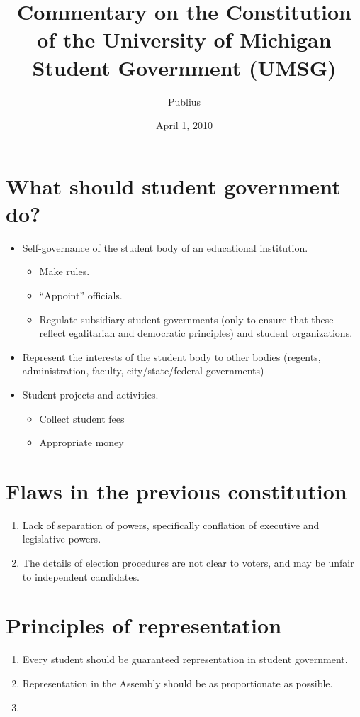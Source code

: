 \documentclass[12pt,letterpaper]{article}
\begin{document}
\title{Commentary on the Constitution of the University of Michigan Student Government (UMSG)}
\author{Publius}
\date{April 1, 2010}
\maketitle


\section*{What should student government do?}
\begin{itemize}
	\item Self-governance of the student body of an educational institution.
	\begin{itemize}
		\item Make rules.
		\item ``Appoint'' officials.
		\item Regulate subsidiary student governments (only to ensure that these reflect egalitarian and democratic principles) and student organizations.
	\end{itemize}
	\item Represent the interests of the student body to other bodies (regents, administration, faculty, city/state/federal governments)
	\item Student projects and activities.
	\begin{itemize}
		\item Collect student fees
		\item Appropriate money
	\end{itemize}
\end{itemize}


\section*{Flaws in the previous constitution}

\begin{enumerate}
	\item Lack of separation of powers, specifically conflation of executive and legislative powers.
	\item The details of election procedures are not clear to voters, and may be unfair to independent candidates.
\end{enumerate}


\section*{Principles of representation}

\begin{enumerate}
	\item Every student should be guaranteed representation in student government.
	\item Representation in the Assembly should be as proportionate as possible.
	\item
\end{enumerate}
\end{document}

